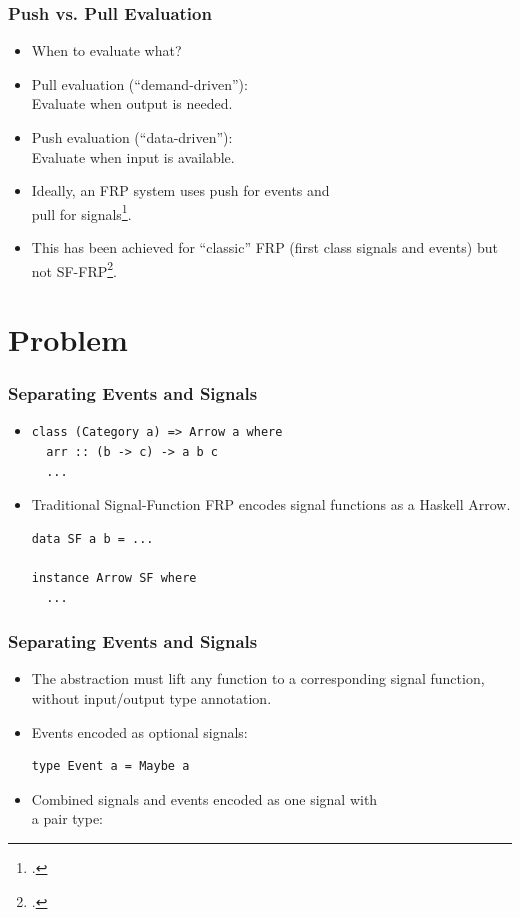\documentclass{beamer}
\begin{document}
\begin{frame}
\frametitle{Push vs. Pull Evaluation}
    \begin{itemize}
        \item When to evaluate what?
        \item Pull evaluation (``demand-driven''):\\ Evaluate when output is needed.
        \item Push evaluation (``data-driven''):\\ Evaluate when input is available.
        \item Ideally, an FRP system uses push for events and\\
              pull for signals\footcite{Elliott2009}.
        \item This has been achieved for ``classic'' FRP
              (first class signals and events) but not SF-FRP\footcite{Elliott2009}.
    \end{itemize}
\end{frame}

\section{Problem}

\begin{frame}[fragile]
\frametitle{Separating Events and Signals}
    \begin{itemize}
        \item[] 
\begin{Verbatim}
class (Category a) => Arrow a where
  arr :: (b -> c) -> a b c
  ...
\end{Verbatim}
        \item Traditional Signal-Function FRP encodes signal functions as a Haskell Arrow.
\begin{Verbatim}
data SF a b = ...

instance Arrow SF where
  ...
\end{Verbatim}
    \end{itemize}
\end{frame}

\begin{frame}[fragile]
\frametitle{Separating Events and Signals}
    \begin{itemize}
        \item The abstraction must lift any function to a corresponding signal function, without input/output type annotation.
        \item Events encoded as optional signals:
\begin{Verbatim}
type Event a = Maybe a
\end{Verbatim}
        \item Combined signals and events encoded as one signal with\\
              a pair type:
    \end{itemize}
\end{frame}
\end{document}
